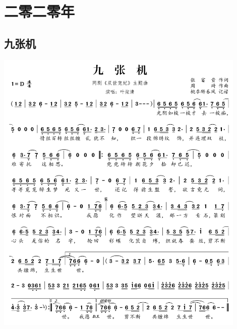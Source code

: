 \documentclass[cn,pad,twocol]{elegantbook}
\begin{document}
\chapter{二零二零年}
\section{九张机} \includegraphics[width=0.9\textwidth]{macos/2020九张机.png}
\end{document}
